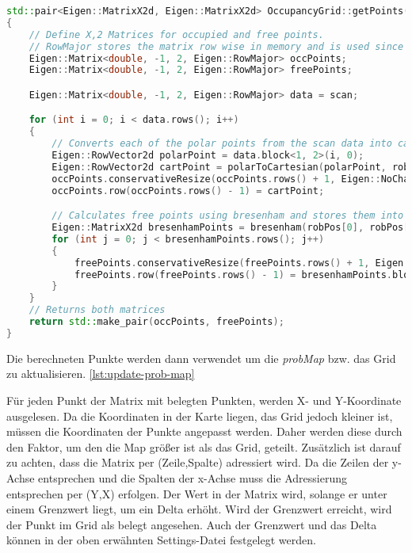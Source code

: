 \begin{lstlisting}[caption={Berechnung occPoints und freePoints},label={lst:getPoints},language={C++}]
std::pair<Eigen::MatrixX2d, Eigen::MatrixX2d> OccupancyGrid::getPoints(const Eigen::MatrixX2d &scan, const Eigen::RowVector2d &robPos, double robRotAngle)
{
    // Define X,2 Matrices for occupied and free points.
    // RowMajor stores the matrix row wise in memory and is used since each point is represented by one row in the matrix.
    Eigen::Matrix<double, -1, 2, Eigen::RowMajor> occPoints;
    Eigen::Matrix<double, -1, 2, Eigen::RowMajor> freePoints;

    Eigen::Matrix<double, -1, 2, Eigen::RowMajor> data = scan;

    for (int i = 0; i < data.rows(); i++)
    {
        // Converts each of the polar points from the scan data into cartesian and stores it in occPoints
        Eigen::RowVector2d polarPoint = data.block<1, 2>(i, 0);
        Eigen::RowVector2d cartPoint = polarToCartesian(polarPoint, robPos, robRotAngle);
        occPoints.conservativeResize(occPoints.rows() + 1, Eigen::NoChange);
        occPoints.row(occPoints.rows() - 1) = cartPoint;

        // Calculates free points using bresenham and stores them into freePoints
        Eigen::MatrixX2d bresenhamPoints = bresenham(robPos[0], robPos[1], cartPoint[0], cartPoint[1]);
        for (int j = 0; j < bresenhamPoints.rows(); j++)
        {
            freePoints.conservativeResize(freePoints.rows() + 1, Eigen::NoChange);
            freePoints.row(freePoints.rows() - 1) = bresenhamPoints.block<1, 2>(j, 0);
        }
    }
    // Returns both matrices
    return std::make_pair(occPoints, freePoints);
}
\end{lstlisting}

Die berechneten Punkte werden dann verwendet um die \textit{probMap} bzw. das Grid zu aktualisieren. \ref{lst:update-prob-map}

Für jeden Punkt der Matrix mit belegten Punkten, werden X- und Y-Koordinate ausgelesen.
Da die Koordinaten in der Karte liegen, das Grid jedoch kleiner ist, müssen die Koordinaten der Punkte angepasst werden.
Daher werden diese durch den Faktor, um den die Map größer ist als das Grid, geteilt.
Zusätzlich ist darauf zu achten, dass die Matrix per (Zeile,Spalte) adressiert wird.
Da die Zeilen der y-Achse entsprechen und die Spalten der x-Achse muss die Adressierung entsprechen per (Y,X) erfolgen.
Der Wert in der Matrix wird, solange er unter einem Grenzwert liegt, um ein Delta erhöht.
Wird der Grenzwert erreicht, wird der Punkt im Grid als belegt angesehen.
Auch der Grenzwert und das Delta können in der oben erwähnten Settings-Datei festgelegt werden.

